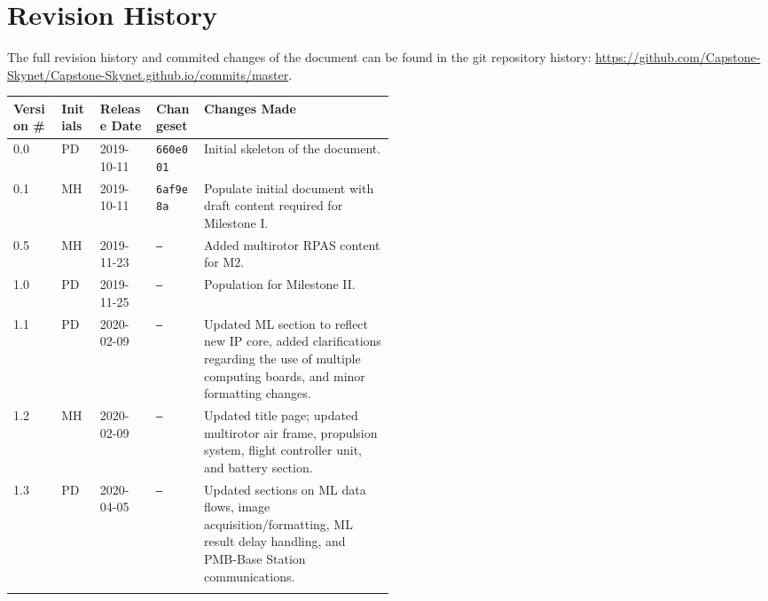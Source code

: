 \section*{Revision History}
The full revision history and commited changes of the document can be found in the git repository history: \href{https://github.com/Capstone-Skynet/Capstone-Skynet.github.io}{https://github.com/Capstone-Skynet/Capstone-Skynet.github.io/commits/master}.

\begin{table}[H]
\begin{tabular}{*{4}{l}p{0.5\linewidth}}
\hline
Version \# & Initials & Release Date & Changeset & Changes Made \\ \hline

0.0 & PD & 2019-10-11 & \texttt{660e001} & Initial skeleton of the document.\\
0.1 & MH & 2019-10-11 & \texttt{6af9e8a} & Populate initial document with draft content required for Milestone I.\\
0.5 & MH & 2019-11-23 & \texttt{--} & Added multirotor RPAS content for M2.\\
1.0 & PD & 2019-11-25 & \texttt{--} & Population for Milestone II.\\ 
1.1 & PD & 2020-02-09 & \texttt{--} & Updated ML section to reflect new IP core, added clarifications regarding the use of multiple computing boards, and minor formatting changes.\\ 
1.2 & MH & 2020-02-09 & \texttt{--} & Updated title page; updated multirotor air frame, propulsion system, flight controller unit, and battery section.\\ 
1.3 & PD & 2020-04-05 & \texttt{--} & Updated sections on ML data flows, image acquisition/formatting, ML result delay handling, and PMB-Base Station communications.\\ 

 & & & \\ \hline
\end{tabular}
\end{table}
